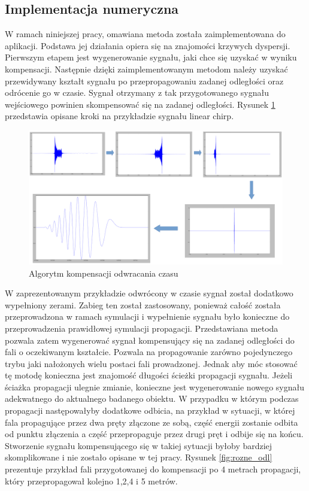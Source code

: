 \subsection{Implementacja numeryczna}
W ramach niniejszej pracy, omawiana metoda została zaimplementowana do aplikacji. Podstawa jej działania opiera się na znajomości krzywych dyspersji. Pierwszym etapem jest wygenerowanie sygnału, jaki chce się uzyskać w wyniku kompensacji. Następnie dzięki zaimplementowanym metodom należy uzyskać przewidywany kształt sygnału po przepropagowaniu zadanej odległości oraz odrócenie go w czasie. Sygnał otrzymany z tak przygotowanego sygnału wejściowego powinien skompensować się na zadanej odległości. Rysunek \ref{fig:kolejne_etapy_TR} przedstawia opisane kroki na przykładzie sygnału linear chirp.
\begin{figure}[h]
\centering
\includegraphics[width=14cm]{Zdjecia/4/algorytm_komp_tr}
\caption{Algorytm kompensacji odwracania czasu}
\label{fig:kolejne_etapy_TR}
\end{figure}

W zaprezentowanym przykładzie odwrócony w czasie sygnał został dodatkowo wypełniony zerami. Zabieg ten został zastosowany, ponieważ całość została przeprowadzona w ramach symulacji i wypełnienie sygnału było konieczne do przeprowadzenia prawidłowej symulacji propagacji. Przedstawiana metoda pozwala zatem wygenerować sygnał kompensujący się na zadanej odległości do fali o oczekiwanym kształcie. Pozwala na propagowanie zarówno pojedynczego trybu jaki nałożonych wielu postaci fali prowadzonej. Jednak aby móc stosować tę motodę konieczna jest znajomość długości ścieżki propagacji sygnału. Jeżeli ściażka propagacji ulegnie zmianie, konieczne jest wygenerowanie nowego sygnału adekwatnego do aktualnego badanego obiektu. W przypadku w którym podczas propagacji następowałyby dodatkowe odbicia, na przykład w sytuacji, w której fala propagujące przez dwa pręty złączone ze sobą, część energii zostanie odbita od punktu złączenia a część przepropaguje przez drugi pręt i odbije się na końcu. Stworzenie sygnału kompensującego się w takiej sytuacji byłoby bardziej skomplikowane i nie zostało opisane w tej pracy. Rysunek \ref{fig:rozne_odl} prezentuje przykład fali przygotowanej do kompensacji po 4 metrach propagacji, który przepropagował kolejno 1,2,4 i 5 metrów.

